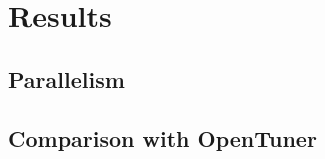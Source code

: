\section{Results}
\label{sec:results}

\subsection{Parallelism}
\subsection{Comparison with OpenTuner}
